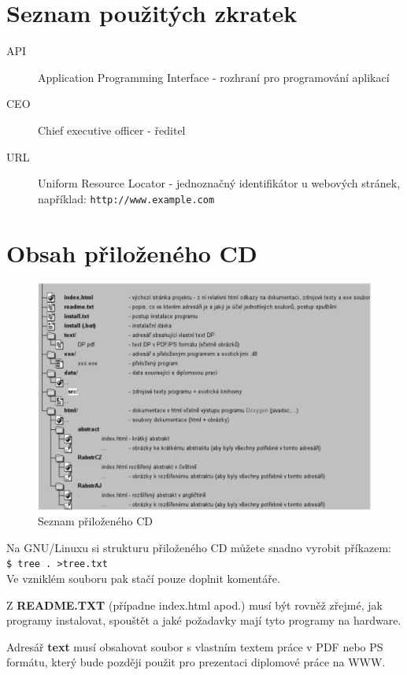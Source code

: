 \documentclass[11pt,twoside,a4paper]{book}
\begin{document}
\appendix

\chapter{Seznam použitých zkratek}

\begin{description}
\item[API] Application Programming Interface - rozhraní pro programování aplikací %
\item[CEO] Chief executive officer - ředitel
\item[URL] Uniform Resource Locator - jednoznačný identifikátor u webových stránek, například: \verb|http://www.example.com| %
\end{description}

\chapter{Obsah přiloženého CD}

\begin{figure}[h]
\begin{center}
\includegraphics[width=14cm]{figures/seznamcd}
\caption{Seznam přiloženého CD}
\label{fig:seznamcd}
\end{center}
\end{figure}

Na GNU/Linuxu si strukturu přiloženého CD můžete snadno vyrobit příkazem:\\ 
\verb|$ tree . >tree.txt|\\
Ve vzniklém souboru pak stačí pouze doplnit komentáře.

Z \textbf{README.TXT} (případne index.html apod.)  musí být rovněž zřejmé, jak programy instalovat, spouštět a jaké požadavky mají tyto programy na hardware.

Adresář \textbf{text}  musí obsahovat soubor s vlastním textem práce v PDF nebo PS formátu, který bude později použit pro prezentaci diplomové práce na WWW.
\end{document}
